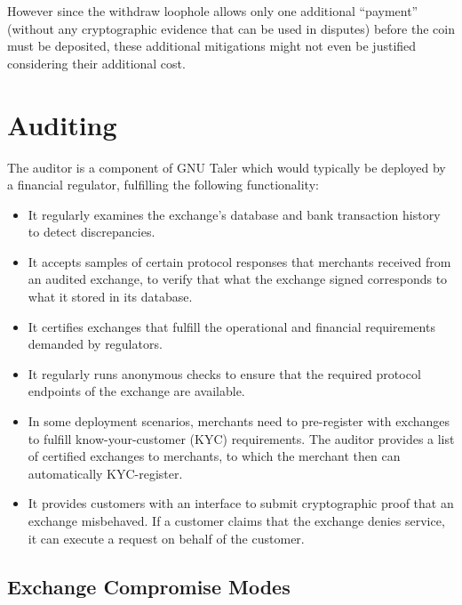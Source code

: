 However since the withdraw loophole allows only one additional ``payment'' (without any
cryptographic evidence that can be used in disputes) before the coin must be deposited,
these additional mitigations might not even be justified considering their additional cost.


\section{Auditing}
The auditor is a component of GNU Taler which would typically be deployed by a
financial regulator, fulfilling the following functionality:
\begin{itemize}
  \item It regularly examines the exchange's database and
    bank transaction history to detect discrepancies.
  \item It accepts samples of certain protocol responses that merchants
    received from an audited exchange, to verify that what the exchange signed
    corresponds to what it stored in its database.
  \item It certifies exchanges that fulfill the operational and financial requirements
    demanded by regulators.
  \item It regularly runs anonymous checks to ensure that the required protocol
    endpoints of the exchange are available.
  \item In some deployment scenarios, merchants need to pre-register with exchanges to fulfill know-your-customer (KYC) requirements.
    The auditor provides a list of certified exchanges to merchants,
    to which the merchant then can automatically KYC-register.
  \item It provides customers with an interface to submit cryptographic proof that an exchange
    misbehaved.  If a customer claims that the exchange denies service, it can execute a request on
    behalf of the customer.
\end{itemize}




\subsection{Exchange Compromise Modes}

